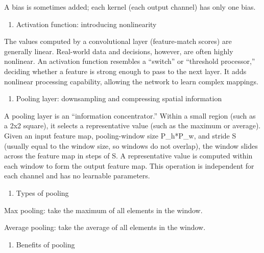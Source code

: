 A bias is sometimes added; each kernel (each output channel) has only one bias.

\begin{enumerate}
\def\labelenumi{\arabic{enumi}.}
\setcounter{enumi}{1}
\tightlist
\item
  Activation function: introducing nonlinearity
\end{enumerate}

The values computed by a convolutional layer (feature-match scores) are generally linear. Real-world data and decisions, however, are often highly nonlinear. An activation function resembles a ``switch'' or ``threshold processor,'' deciding whether a feature is strong enough to pass to the next layer. It adds nonlinear processing capability, allowing the network to learn complex mappings.

\begin{enumerate}
\def\labelenumi{\arabic{enumi}.}
\setcounter{enumi}{2}
\tightlist
\item
  Pooling layer: downsampling and compressing spatial information
\end{enumerate}

A pooling layer is an ``information concentrator.'' Within a small region (such as a 2x2 square), it selects a representative value (such as the maximum or average). Given an input feature map, pooling-window size P\_h*P\_w, and stride S (usually equal to the window size, so windows do not overlap), the window slides across the feature map in steps of S. A representative value is computed within each window to form the output feature map. This operation is independent for each channel and has no learnable parameters.

\begin{enumerate}
\def\labelenumi{(\arabic{enumi})}
\tightlist
\item
  Types of pooling
\end{enumerate}

Max pooling: take the maximum of all elements in the window.

Average pooling: take the average of all elements in the window.

\begin{enumerate}
\def\labelenumi{(\arabic{enumi})}
\setcounter{enumi}{1}
\tightlist
\item
  Benefits of pooling
\end{enumerate}

